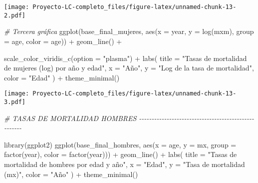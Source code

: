 \documentclass[
]{article}
\newenvironment{Shaded}{\begin{snugshade}}{\end{snugshade}}
\newcommand{\AttributeTok}[1]{\textcolor[rgb]{0.77,0.63,0.00}{#1}}
\newcommand{\CommentTok}[1]{\textcolor[rgb]{0.56,0.35,0.01}{\textit{#1}}}
\newcommand{\FunctionTok}[1]{\textcolor[rgb]{0.00,0.00,0.00}{#1}}
\newcommand{\NormalTok}[1]{#1}
\newcommand{\SpecialCharTok}[1]{\textcolor[rgb]{0.00,0.00,0.00}{#1}}
\newcommand{\StringTok}[1]{\textcolor[rgb]{0.31,0.60,0.02}{#1}}
\begin{document}
\texttt{[image: Proyecto-LC-completo\_files/figure-latex/unnamed-chunk-13-2.pdf]}

\begin{Shaded}
\begin{Highlighting}[]
\CommentTok{\# Tercera gráfica}
\FunctionTok{ggplot}\NormalTok{(base\_final\_mujeres, }\FunctionTok{aes}\NormalTok{(}\AttributeTok{x =}\NormalTok{ year, }
                               \AttributeTok{y =} \FunctionTok{log}\NormalTok{(mxm),      }
                               \AttributeTok{group =}\NormalTok{ age, }
                               \AttributeTok{color =}\NormalTok{ age)) }\SpecialCharTok{+}
  \FunctionTok{geom\_line}\NormalTok{() }\SpecialCharTok{+}
  
  \FunctionTok{scale\_color\_viridis\_c}\NormalTok{(}\AttributeTok{option =} \StringTok{"plasma"}\NormalTok{) }\SpecialCharTok{+}  
  \FunctionTok{labs}\NormalTok{(}
    \AttributeTok{title =} \StringTok{"Tasas de mortalidad de mujeres (log) por año y edad"}\NormalTok{,}
    \AttributeTok{x =} \StringTok{"Año"}\NormalTok{,}
    \AttributeTok{y =} \StringTok{"Log de la tasa de mortalidad"}\NormalTok{,}
    \AttributeTok{color =} \StringTok{"Edad"}
\NormalTok{  ) }\SpecialCharTok{+}
  \FunctionTok{theme\_minimal}\NormalTok{()}
\end{Highlighting}
\end{Shaded}

\texttt{[image: Proyecto-LC-completo\_files/figure-latex/unnamed-chunk-13-3.pdf]}

\begin{Shaded}
\begin{Highlighting}[]
\CommentTok{\# TASAS DE MORTALIDAD HOMBRES {-}{-}{-}{-}{-}{-}{-}{-}{-}{-}{-}{-}{-}{-}{-}{-}{-}{-}{-}{-}{-}{-}{-}{-}{-}{-}{-}{-}{-}{-}{-}{-}{-}{-}{-}{-}{-}{-}{-}{-}{-}{-}{-}{-}{-}{-}{-}{-}{-}{-}{-}{-}{-}}

\FunctionTok{library}\NormalTok{(ggplot2)}
\FunctionTok{ggplot}\NormalTok{(base\_final\_hombres, }\FunctionTok{aes}\NormalTok{(}\AttributeTok{x =}\NormalTok{ age, }\AttributeTok{y =}\NormalTok{ mx, }\AttributeTok{group =} \FunctionTok{factor}\NormalTok{(year), }\AttributeTok{color =} \FunctionTok{factor}\NormalTok{(year))) }\SpecialCharTok{+}
  \FunctionTok{geom\_line}\NormalTok{() }\SpecialCharTok{+}
  \FunctionTok{labs}\NormalTok{(}
    \AttributeTok{title =} \StringTok{"Tasas de mortalidad de hombres por edad y año"}\NormalTok{,}
    \AttributeTok{x =} \StringTok{"Edad"}\NormalTok{,}
    \AttributeTok{y =} \StringTok{"Tasa de mortalidad (mx)"}\NormalTok{,}
    \AttributeTok{color =} \StringTok{"Año"}
\NormalTok{  ) }\SpecialCharTok{+}
  \FunctionTok{theme\_minimal}\NormalTok{()}
\end{Highlighting}
\end{Shaded}
\end{document}
